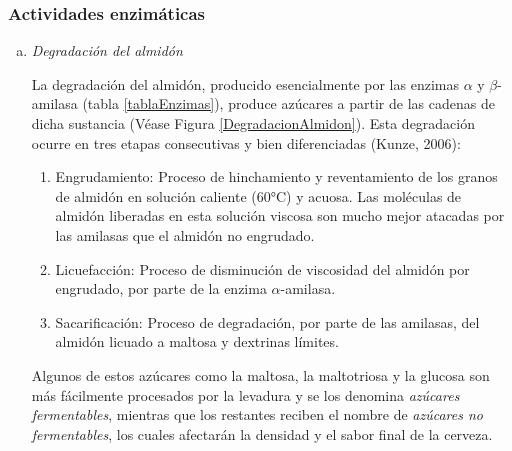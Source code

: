             \subsubsection{Actividades enzimáticas}
                \begin{enumerate}[a)]
                    \item \textit{Degradación del almidón}
                        \par La degradación del almidón, producido esencialmente por las enzimas $\alpha$ y $\beta$-amilasa (tabla \ref{tablaEnzimas}), produce azúcares a partir de las cadenas de dicha sustancia (Véase Figura \ref{DegradacionAlmidon}). Esta degradación ocurre en tres etapas consecutivas y bien diferenciadas (Kunze, 2006):
                        
                        \begin{enumerate}[1.]
                            \item Engrudamiento: Proceso de hinchamiento y reventamiento de los granos de almidón en solución caliente (60°C) y acuosa. Las moléculas de almidón liberadas en esta solución viscosa son mucho mejor atacadas por las amilasas que el almidón no engrudado.
                            
                            \item Licuefacción: Proceso de disminución de viscosidad del almidón por engrudado, por parte de la enzima $\alpha$-amilasa.
                            
                            \item Sacarificación: Proceso de degradación, por parte de las amilasas, del almidón licuado a maltosa y dextrinas límites.
                        \end{enumerate}
                        
                        \par Algunos de estos azúcares como la maltosa, la maltotriosa y la glucosa son más fácilmente procesados por la levadura y se los denomina \textit{azúcares fermentables}, mientras que los restantes reciben el nombre de \textit{azúcares no fermentables}, los cuales afectarán la densidad y el sabor final de la cerveza.
                        

\end{enumerate}
